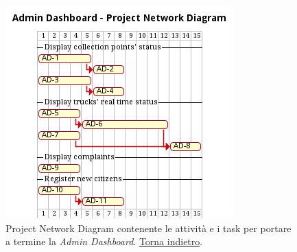 \begin{figure}[H]
    \centering
    \includegraphics[width=\textwidth]{img/gantt-admin-dashboard.pm}
    \caption{Project Network Diagram contenente le attività e i task per portare a termine la \textit{Admin Dashboard}. \hyperlink{back:gantt-admin-dashboard}{Torna indietro}.}
    \label{fig:gantt-admin-dashboard}
\end{figure}

